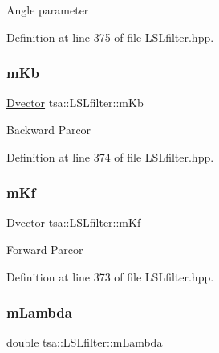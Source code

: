 Angle parameter 

Definition at line 375 of file L\+S\+Lfilter.\+hpp.

\mbox{\label{classtsa_1_1_l_s_lfilter_ae3b9ac48debc547e1aa69ae0ade36408}} 
\subsubsection{\texorpdfstring{m\+Kb}{mKb}}
{\footnotesize\ttfamily \hyperlink{namespacetsa_a8900fb03d849baf447a1a0efe2561fb2}{Dvector} tsa\+::\+L\+S\+Lfilter\+::m\+Kb\hspace{0.3cm}{\ttfamily [private]}}

Backward Parcor 

Definition at line 374 of file L\+S\+Lfilter.\+hpp.

\mbox{\label{classtsa_1_1_l_s_lfilter_a83a3095a513fda5efd6b75aaa77495df}} 
\subsubsection{\texorpdfstring{m\+Kf}{mKf}}
{\footnotesize\ttfamily \hyperlink{namespacetsa_a8900fb03d849baf447a1a0efe2561fb2}{Dvector} tsa\+::\+L\+S\+Lfilter\+::m\+Kf\hspace{0.3cm}{\ttfamily [private]}}

Forward Parcor 

Definition at line 373 of file L\+S\+Lfilter.\+hpp.

\mbox{\label{classtsa_1_1_l_s_lfilter_aeae300f77e90ba968cc9c5c0eea38a96}} 
\subsubsection{\texorpdfstring{m\+Lambda}{mLambda}}
{\footnotesize\ttfamily double tsa\+::\+L\+S\+Lfilter\+::m\+Lambda\hspace{0.3cm}{\ttfamily [private]}}

